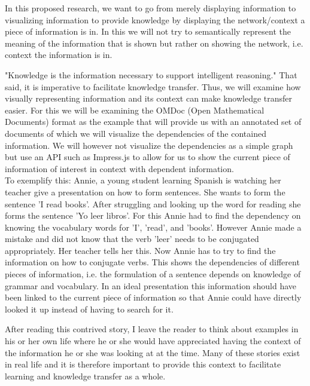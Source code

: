 \documentclass[twoside]{article}
\begin{document}
In this proposed research, we want to go from merely displaying information to visualizing information to provide knowledge by displaying the network/context a piece of information is in. In this we will not try to semantically represent the meaning of the information that is shown but rather on showing the network, i.e. context the information is in.


"Knowledge is the information necessary to support intelligent reasoning." \cite{Kohlhase} That said, it is imperative to facilitate knowledge transfer.  Thus, we will examine how visually representing information and its context can make knowledge transfer easier. For this we will be examining the OMDoc (Open Mathematical Documents) format as the example that will provide us with an annotated set of documents of which we will visualize the dependencies of the contained information. We will however not visualize the dependencies as a simple graph but use an API such as Impress.js to allow for us to show the current piece of information of interest in context with dependent information.\\

To exemplify this: Annie, a young student learning Spanish is watching her teacher give a presentation on how to form sentences. She wants to form the sentence 'I read books'. After struggling and looking up the word for reading she forms the sentence 'Yo leer libros'. For this Annie had to find the dependency on knowing the vocabulary words for 'I', 'read', and 'books'. However Annie made a mistake and did not know that the verb 'leer' needs to be conjugated appropriately. Her teacher tells her this. Now Annie has to try to find the information on how to conjugate verbs. This shows the dependencies of different pieces of information, i.e. the formulation of a sentence depends on knowledge of grammar and vocabulary. In an ideal presentation this information should have been linked to the current piece of information so that Annie could have directly looked it up instead of having to search for it.

After reading this contrived story, I leave the reader to think about examples in his or her own life where he or she would have appreciated having the context of the information he or she was looking at at the time. Many of these stories exist in real life and it is therefore important to provide this context to facilitate learning and knowledge transfer as a whole. 
\end{document}

